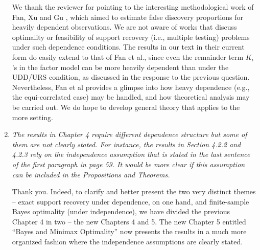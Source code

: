 \documentclass[11pt]{article}
\begin{document}
\begin{enumerate}
    We thank the reviewer for pointing to the interesting methodological work of Fan, Xu and Gu \cite{fan:xu:gu:2012}, which aimed to estimate false discovery proportions for heavily dependent observations. 
    We are not aware of works that discuss optimality or feasibility of support recovery (i.e., multiple testing) problems under such dependence conditions.
    The results in our text in their current form do easily extend to that of Fan et al., since even the remainder term $K_i$'s in the factor model can be more heavily dependent than under the UDD/URS condition, as discussed in the response to the previous question.
    Nevertheless, Fan et al provides a glimpse into how heavy dependence (e.g., the equi-correlated case) may be handled, and how theoretical analysis may be carried out. We do hope to develop general theory that applies to the more setting.
    
   
    \item  {\em The results in Chapter 4 require different dependence structure but some of them are not clearly stated. For instance, the results in Section 4.2.2 and 4.2.3 rely on the independence assumption that is stated in the last sentence of the first paragraph in page 59. It would be more clear if this assumption can be included in the Propositions and Theorems.}
    
    Thank you.  Indeed, to clarify and better present the two very distinct themes -- exact support recovery under dependence, on one hand, and 
    finite-sample Bayes optimality (under independence), we have divided the previous Chapter 4 in two -- the new Chapters 4 and 5. The new
    Chapter 5 entitled ``Bayes and Minimax Optimality'' now presents the results in a much more organized fashion where the independence 
    assumptions are clearly stated. 
    

\end{enumerate}
\end{document}
